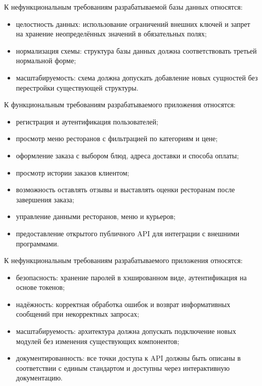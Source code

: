 К нефункциональным требованиям разрабатываемой базы данных относятся:
\begin{itemize}
    \item целостность данных: использование ограничений внешних ключей и запрет
    на хранение неопределённых значений в обязательных полях;
    \item нормализация схемы: структура базы данных должна соответствовать третьей нормальной форме;
    \item масштабируемость: схема должна допускать добавление новых сущностей
    без перестройки существующей структуры.
\end{itemize}

К функциональным требованиям разрабатываемого приложения относятся:
\begin{itemize}
    \item регистрация и аутентификация пользователей;
    \item просмотр меню ресторанов с фильтрацией по категориям и цене;
    \item оформление заказа с выбором блюд, адреса доставки и способа оплаты;
    \item просмотр истории заказов клиентом;
    \item возможность оставлять отзывы и выставлять оценки ресторанам после завершения заказа;
    \item управление данными ресторанов, меню и курьеров;
    \item предоставление открытого публичного API для интеграции с внешними программами.
\end{itemize}

К нефункциональным требованиям разрабатываемого приложения относятся:
\begin{itemize}
    \item безопасность: хранение паролей в хэшированном виде,
    аутентификация на основе токенов;
    \item надёжность: корректная обработка ошибок и возврат информативных
    сообщений при некорректных запросах;
    \item масштабируемость: архитектура должна допускать подключение
    новых модулей без изменения существующих компонентов;
    \item документированность: все точки доступа к API должны быть описаны в соответствии с единым стандартом и доступны через интерактивную документацию.
\end{itemize}

